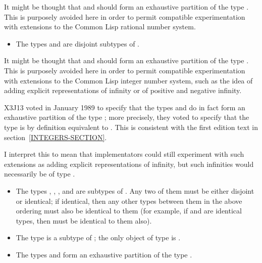 \beforenoterule
\begin{rationale}
It might be thought that  and  should
form an exhaustive partition of the type .  This is purposely
avoided here in order to permit compatible experimentation with extensions
to the Common Lisp rational number system.
\end{rationale}
\afternoterule

\begin{obsolete}
\begin{itemize}
\item
The types  and  are disjoint subtypes of .
\end{itemize}

\beforenoterule
\begin{rationale}
It might be thought that  and  should
form an exhaustive partition of the type .  This is purposely
avoided here in order to permit compatible experimentation with
extensions to the Common Lisp integer number system, such as the idea of
adding explicit representations of infinity or of positive and negative
infinity.
\end{rationale}
\afternoterule
\end{obsolete}

\begin{new}
X3J13 voted in January 1989
to specify that the types  and 
do in fact form an exhaustive partition of the type ; more precisely,
they voted to specify that the type  is by definition equivalent
to .  This is consistent with the
first edition text in section~\ref{INTEGERS-SECTION}.

I interpret this to mean that implementators could still experiment with
such extensions as adding explicit representations of infinity, but such infinities
would necessarily be of type .
\end{new}

\begin{itemize}
\item
The types , , , and
 are subtypes of .  Any two of them must be
either disjoint or identical; if identical, then any other types between
them in the above ordering must also be identical to them
(for example, if  and  are identical types,
then  must be identical to them also).

\item
The type  is a subtype of ; the only object of type
 is {\nil}.

\item
The types  and  form an exhaustive partition of the type
.
\end{itemize}

